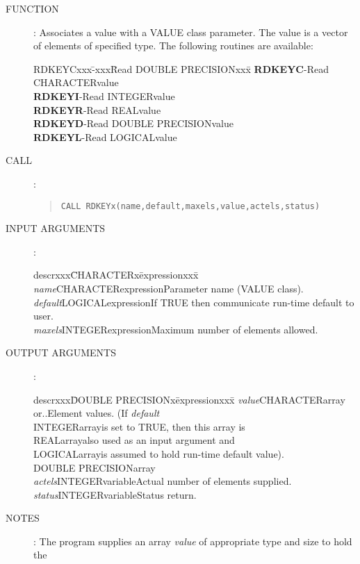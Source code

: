 \begin{description}
\item [FUNCTION]:
Associates a value with a VALUE class parameter.
The value is a vector of elements of specified type.
The following routines are available:
\begin{center}
\begin{tabbing}
RDKEYCxxx\=-xxx\=Read DOUBLE PRECISIONxxx\=\kill
{\bf RDKEYC}\>-\>Read CHARACTER\>value\\
{\bf RDKEYI}\>-\>Read INTEGER\>value\\
{\bf RDKEYR}\>-\>Read REAL\>value\\
{\bf RDKEYD}\>-\>Read DOUBLE PRECISION\>value\\
{\bf RDKEYL}\>-\>Read LOGICAL\>value
\end{tabbing}
\end{center}
\item [CALL]:
\begin{quote}
{\tt CALL RDKEYx(name,default,maxels,value,actels,status)}
\end{quote}
\item [INPUT ARGUMENTS]:
\begin{tabbing}
descrxxx\=CHARACTERx\=expressionxxx\=\kill
{\em name}\>CHARACTER\>expression\>Parameter name (VALUE class).\\
{\em default}\>LOGICAL\>expression\>If TRUE then communicate run-time default to user.\\
{\em maxels}\>INTEGER\>expression\>Maximum number of elements allowed.
\end{tabbing}
\item [OUTPUT ARGUMENTS]:
\begin{tabbing}
descrxxx\=DOUBLE PRECISIONx\=expressionxxx\=\kill
{\em value}\>CHARACTER\>array or..\>Element values.  (If {\em default}\\
\>INTEGER\>array\>is set to TRUE, then this array is\\
\>REAL\>array\>also used as an input argument and\\
\>LOGICAL\>array\>is assumed to hold run-time default value).\\
\>DOUBLE PRECISION\>array\\
{\em actels}\>INTEGER\>variable\>Actual number of elements supplied.\\
{\em status}\>INTEGER\>variable\>Status return.
\end{tabbing}
\item [NOTES]:
The program supplies an array {\em value} of appropriate type and size to hold the

\end{description}
